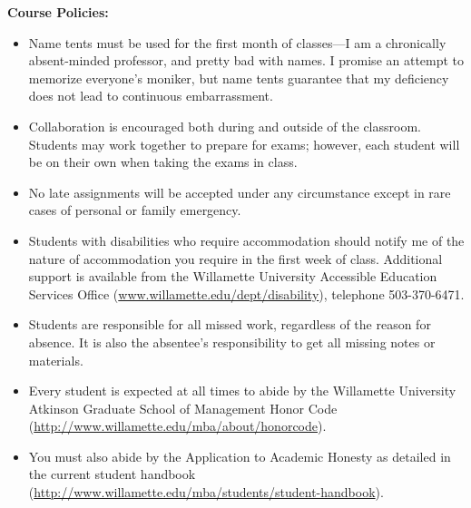 \documentclass[11pt]{article}
\begin{document}
\newpage
\textbf {\large Course Policies:}
\begin{itemize}
			\item Name tents must be used for the first month of classes---I am a chronically absent-minded professor, and pretty bad with names. I promise an attempt to memorize everyone's moniker, but name tents guarantee that my deficiency does not lead to continuous embarrassment. 
			\item Collaboration is encouraged both during and outside of the classroom. Students may work together to prepare for exams; however, each student will be on their own when taking the exams in class. 
			\item No late assignments will be accepted under any circumstance except in rare cases of personal or family emergency.
			\item Students with disabilities who require accommodation should notify me of the nature of accommodation you require in the first week of class.  Additional support is available from the Willamette University Accessible Education Services Office (\href{www.willamette.edu/dept/disability}{www.willamette.edu/dept/disability}), telephone 503-370-6471.
			\item Students are responsible for all missed work, regardless of the reason for absence. It is also the absentee's responsibility to get all missing notes or materials. 
			
		\item Every student is expected at all times to abide by the Willamette University Atkinson Graduate School of Management Honor Code (\href{http://www.willamette.edu/mba/about/honorcode/index.html}{http://www.willamette.edu/mba/about/honorcode}).
		\item You must also abide by the Application to Academic Honesty as detailed in the current student handbook (\href{http://www.willamette.edu/mba/students/student-handbook/}{http://www.willamette.edu/mba/students/student-handbook}).
		\end{itemize}
\end{document}
